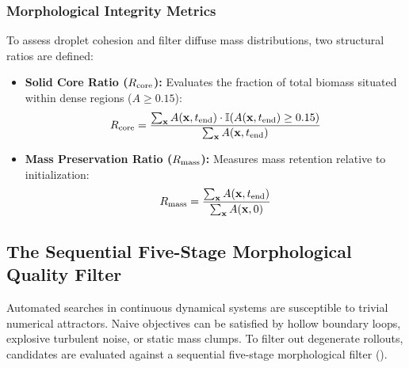 \subsubsection{Morphological Integrity Metrics}
To assess droplet cohesion and filter diffuse mass distributions, two structural ratios are defined:
\begin{itemize}
    \item \textbf{Solid Core Ratio ($R_{\text{core}}$):} Evaluates the fraction of total biomass situated within dense regions ($A \ge 0.15$):
    \begin{equation}
    R_{\text{core}} = \frac{\sum_{\mathbf{x}} A(\mathbf{x}, t_{\text{end}}) \cdot \mathbb{I}(A(\mathbf{x}, t_{\text{end}}) \ge 0.15)}{\sum_{\mathbf{x}} A(\mathbf{x}, t_{\text{end}})}
    \label{eq:core_ratio}
    \end{equation}
    \item \textbf{Mass Preservation Ratio ($R_{\text{mass}}$):} Measures mass retention relative to initialization:
    \begin{equation}
    R_{\text{mass}} = \frac{\sum_{\mathbf{x}} A(\mathbf{x}, t_{\text{end}})}{\sum_{\mathbf{x}} A(\mathbf{x}, 0)}
    \label{eq:mass_ratio}
    \end{equation}
\end{itemize}

\subsection{The Sequential Five-Stage Morphological Quality Filter}
\label{subsec:discovery_watertight_filter}

Automated searches in continuous dynamical systems are susceptible to trivial numerical attractors. Naive objectives can be satisfied by hollow boundary loops, explosive turbulent noise, or static mass clumps. To filter out degenerate rollouts, candidates are evaluated against a sequential five-stage morphological filter ().

